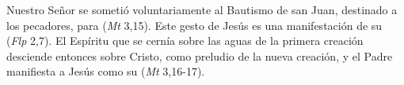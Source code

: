  Nuestro Señor se sometió voluntariamente al Bautismo de san Juan, destinado a los pecadores, para  (\emph{Mt} 3,15). Este gesto de Jesús es una manifestación de su  (\emph{Flp} 2,7). El Espíritu que se cernía sobre las aguas de la primera creación desciende entonces sobre Cristo, como preludio de la nueva creación, y el Padre manifiesta a Jesús como su  (\emph{Mt} 3,16-17).